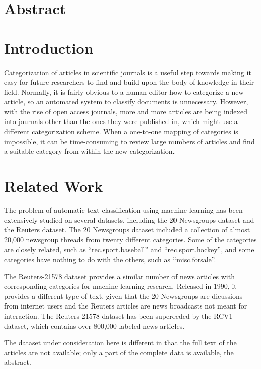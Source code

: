 \documentclass[10pt,twocolumn]{article}
\begin{document}
\section*{Abstract}

\section*{Introduction}

Categorization of articles in scientific journals is a useful step towards making it easy for future researchers to find and build upon the body of knowledge in their field.  Normally, it is fairly obvious to a human editor how to categorize a new article, so an automated system to classify documents is unnecessary.  However, with the rise of open access journals, more and more articles are being indexed into journals other than the ones they were published in, which might use a different categorization scheme.  When a one-to-one mapping of categories is impossible, it can be time-consuming to review large numbers of articles and find a suitable category from within the new categorization.

\section*{Related Work}

The problem of automatic text classification using machine learning has been extensively studied on several datasets, including the 20 Newsgroups dataset and the Reuters dataset.  The 20 Newsgroups dataset included a collection of almost 20,000 newsgroup threads from twenty different categories.  Some of the categories are closely related, such as ``rec.sport.baseball'' and ``rec.sport.hockey'', and some categories have nothing to do with the others, such as ``misc.forsale''.

The Reuters-21578 dataset provides a similar number of news articles with corresponding categories for machine learning research.  Released in 1990, it provides a different type of text, given that the 20 Newsgroups are dicussions from internet users and the Reuters articles are news broadcasts not meant for interaction.  The Reuters-21578 dataset has been superceded by the RCV1 dataset, which contains over 800,000 labeled news articles.

The dataset under consideration here is different in that the full text of the articles are not available; only a part of the complete data is available, the abstract.
\end{document}
